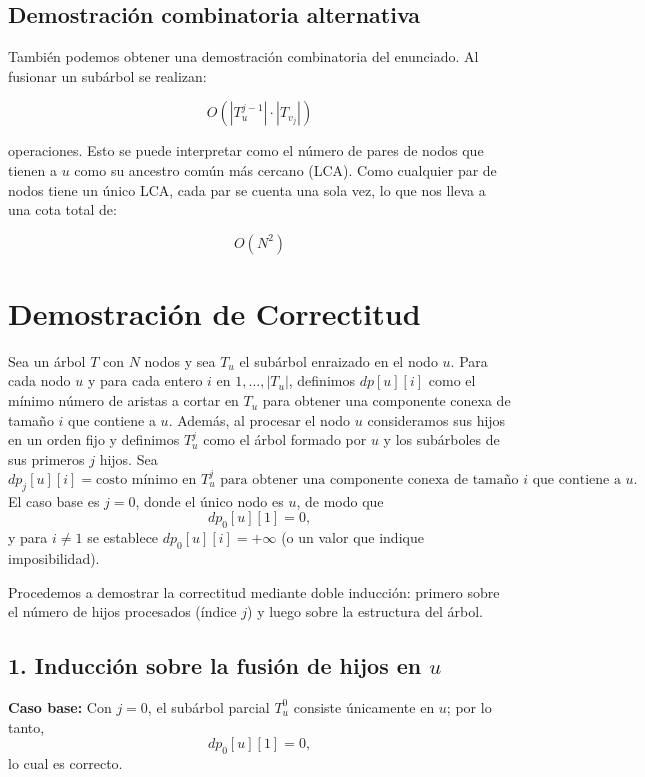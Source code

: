 \documentclass[12pt]{article}
\begin{document}
\subsection{Demostración combinatoria alternativa}

También podemos obtener una demostración combinatoria del enunciado. Al fusionar un subárbol se realizan:

\[
O(|T_u^{j-1}| \cdot |T_{v_j}|)
\]

operaciones. Esto se puede interpretar como el número de pares de nodos que tienen a $u$ como su ancestro común más cercano (LCA).
Como cualquier par de nodos tiene un único LCA, cada par se cuenta una sola vez, lo que nos lleva a una cota total de:

\[
O(N^2)
\]

\section{Demostración de Correctitud}

Sea un árbol \(T\) con \(N\) nodos y sea \(T_u\) el subárbol enraizado en el nodo \(u\). Para cada nodo \(u\) y para cada entero \(i\) en \(1,\dots,|T_u|\), definimos $dp[u][i]$ como el mínimo número de aristas a cortar en  $T_u$ para obtener una componente conexa de tamaño $i$ que contiene a  $u$.
Además, al procesar el nodo \(u\) consideramos sus hijos en un orden fijo y definimos \(T_u^j\) como el árbol formado por \(u\) y los subárboles de sus primeros \(j\) hijos. Sea
\[
dp_j[u][i] = \text{costo mínimo en } T_u^j \text{ para obtener una componente conexa de tamaño } i \text{ que contiene a } u.
\]
El caso base es \(j=0\), donde el único nodo es \(u\), de modo que
\[
dp_0[u][1] = 0,
\]
y para \(i \neq 1\) se establece \(dp_0[u][i] = +\infty\) (o un valor que indique imposibilidad).

Procedemos a demostrar la correctitud mediante doble inducción: primero sobre el número de hijos procesados (índice \(j\)) y luego sobre la estructura del árbol.

\subsection*{1. Inducción sobre la fusión de hijos en \(u\)}

\textbf{Caso base:} Con \(j=0\), el subárbol parcial \(T_u^0\) consiste únicamente en \(u\); por lo tanto,
\[
dp_0[u][1] = 0,
\]
lo cual es correcto.
\end{document}
